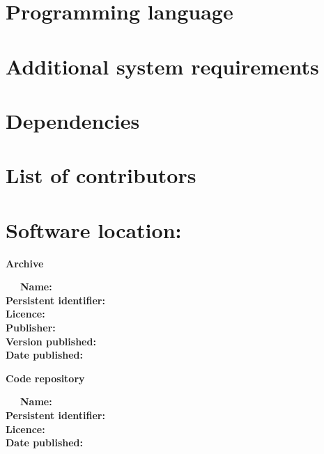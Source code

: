 \documentclass{jors}
\begin{document}
\section*{Programming language}

\section*{Additional system requirements}

\section*{Dependencies}

\section*{List of contributors}

\section*{Software location:}

\textbf{Archive}

~~~\textbf{Name:} \\
\hspace*{0.333em}\hspace*{0.333em}\hspace*{0.333em}\textbf{Persistent
identifier:} \\
\hspace*{0.333em}\hspace*{0.333em}\hspace*{0.333em}\textbf{Licence:} \\
\hspace*{0.333em}\hspace*{0.333em}\hspace*{0.333em}\textbf{Publisher:}
\\
\hspace*{0.333em}\hspace*{0.333em}\hspace*{0.333em}\textbf{Version
published:} \\
\hspace*{0.333em}\hspace*{0.333em}\hspace*{0.333em}\textbf{Date
published:}

\textbf{Code repository}

~~~\textbf{Name:} \\
\hspace*{0.333em}\hspace*{0.333em}\hspace*{0.333em}\textbf{Persistent
identifier:} \\
\hspace*{0.333em}\hspace*{0.333em}\hspace*{0.333em}\textbf{Licence:} \\
\hspace*{0.333em}\hspace*{0.333em}\hspace*{0.333em}\textbf{Date
published:}
\end{document}
